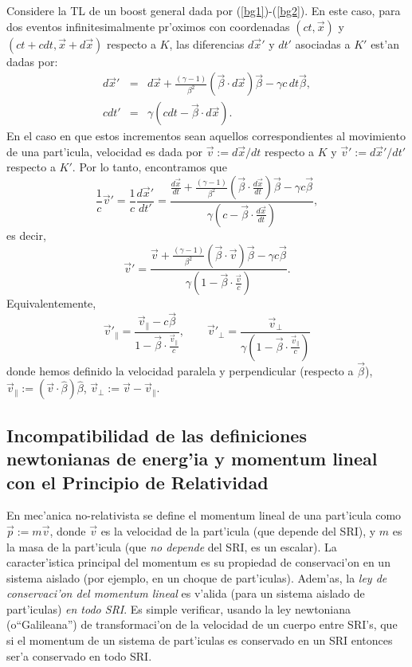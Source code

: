 Considere la TL de un boost general dada por (\ref{bg1})-(\ref{bg2}). En este
caso, para dos eventos infinitesimalmente pr'oximos con coordenadas
$(ct,\vec{x})$ y $(ct+cdt,\vec{x}+d\vec{x})$ respecto a $K$, las diferencias
$d\vec{x}'$ y $dt'$ asociadas a $K'$ est'an dadas por:
\begin{eqnarray}
d\vec{x}'  &  =&d\vec{x}+\frac{\left(  \gamma-1\right)  }{\beta^2}\left(  \vec{\beta}\cdot d\vec{x}\right)  \vec{\beta}-\gamma
c\,dt\vec{\beta},\\
cdt'  &  =&\gamma\left( cdt-\vec{\beta}\cdot d\vec{x}\right)  .
\end{eqnarray}
En el caso en que estos incrementos sean aquellos correspondientes al movimiento
de una part'icula, velocidad es dada por
$\vec{v}:={d\vec{x}}/{dt}$ respecto a $K$ y
$\vec{v}':={d\vec{x}'}/{dt'}$ respecto a $K'$. Por lo tanto, encontramos que
\begin{equation}
\frac{1}{c}\vec{v}'=\frac{1}{c}\frac{d\vec{x}'}{dt'}=\frac{\frac{d\vec{x}}{dt}
+\frac{\left(  \gamma-1\right)  }{\beta^2}\left(  \vec{\beta}\cdot
\frac{d\vec{x}}{dt}\right)  \vec{\beta}-\gamma c\vec{\beta}}{\gamma\left(
c-\vec{\beta}\cdot \frac{d\vec{x}}{dt}\right) },
\end{equation}
es decir,
\begin{equation}
\boxed{
\vec{v}'=\frac{\vec{v}+\frac{\left(  \gamma-1\right)  }{\beta^2}\left(
\vec{\beta}\cdot \vec{v}\right)  \vec{\beta}-\gamma c\vec{\beta}}{\gamma\left(
1-\vec{\beta}\cdot \frac{\vec{v}}{c}\right) }.
} \label{transv}
\end{equation}
Equivalentemente,
\begin{equation}
\vec{v}'_\parallel=\frac{\vec{v}_\parallel- c\vec{\beta}}{1-\vec{\beta}\cdot\frac{\vec{v}_\parallel}{c} }, \qquad 
\vec{v}'_\perp=\frac{\vec{v}_\perp}{\gamma\left(
1-\vec{\beta}\cdot \frac{\vec{v}_\parallel}{c}\right) }
\end{equation}
donde hemos definido la velocidad paralela y perpendicular (respecto a $\vec\beta$), $\vec{v}_\parallel:=(\vec{v}\cdot \hat\beta)\hat\beta$,  $\vec{v}_\perp:=\vec{v}-\vec{v}_\parallel$.

\subsection{Incompatibilidad de las definiciones newtonianas de energ'ia y momentum lineal con el Principio de Relatividad}

En mec'anica no-relativista se define el momentum lineal de una part'icula como
$\vec{p}:=m\vec{v}$, donde $\vec{v}$ es la velocidad de la part'icula (que
depende del SRI), y $m$ es la masa de la part'icula (que \textit{no depende} del SRI, es un escalar). La caracter'istica principal del momentum es su propiedad de conservaci'on en un sistema aislado (por ejemplo, en un choque de part'iculas). Adem'as, la \textit{ley de conservaci'on del momentum lineal} es v'alida (para un sistema aislado de part'iculas) \textit{en todo SRI}. Es simple verificar, usando la ley newtoniana (o``Galileana'') de  transformaci'on de la velocidad de un cuerpo entre SRI's, que si el momentum de un sistema de part'iculas es conservado en un SRI entonces ser'a conservado en todo SRI. 

